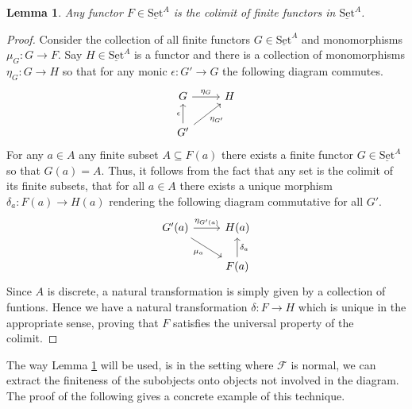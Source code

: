 \documentclass[12pt]{article}
\theoremstyle{plain}
\newtheorem{lemma}[thm]{Lemma}
\theoremstyle{definition}
\newcommand{\scr}[1]{\mathscr{#1}}
\newcommand{\lto}{\longrightarrow}
\newcommand{\set}{\operatorname{\underline{Set}}}
\begin{document}
	\begin{lemma}\label{lem:finite_generation_functors}
		Any functor $F \in \set^A$ is the colimit of finite functors in $\set^A$.
		\end{lemma}
	\begin{proof}
		Consider the collection of all finite functors $G \in \set^A$ and monomorphisms $\mu_G: G \lto F$. Say $H \in \set^A$ is a functor and there is a collection of monomorphisms $\eta_G: G \lto H$ so that for any monic $\epsilon: G' \lto G$ the following diagram commutes.
		\begin{equation}
			\begin{tikzcd}
				G\arrow[r,"{\eta_G}"] & H\\
				G'\arrow[ur,swap,"{\eta_{G'}}"]\arrow[u,"{\epsilon}"]
				\end{tikzcd}
			\end{equation}
		For any $a \in A$ any finite subset $A \subseteq F(a)$ there exists a finite functor $G \in \set^A$ so that $G(a) = A$. Thus, it follows from the fact that any set is the colimit of its finite subsets, that for all $a \in A$ there exists a unique morphism $\delta_a: F(a) \lto H(a)$ rendering the following diagram commutative for all $G'$.
		\begin{equation}
			\begin{tikzcd}
				G'(a)\arrow[r,"{\eta_{G'(a)}}"]\arrow[dr,swap,"{\mu_a}"] & H(a)\\
				& F(a)\arrow[u,swap,"{\delta_a}"]
				\end{tikzcd}
			\end{equation}
		Since $A$ is discrete, a natural transformation is simply given by a collection of funtions. Hence we have a natural transformation $\delta: F \lto H$ which is unique in the appropriate sense, proving that $F$ satisfies the universal property of the colimit.
		\end{proof}
	
	The way Lemma \ref{lem:finite_generation_functors} will be used, is in the setting where $\scr{F}$ is normal, we can extract the finiteness of the subobjects onto objects not involved in the diagram. The proof of the following gives a concrete example of this technique.
	
\end{document}
